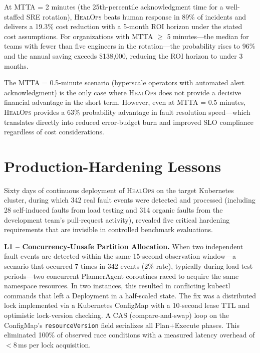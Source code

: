 \documentclass[journal,10pt,twoside]{IEEEtran}
\newcommand{\HealOps}{\textsc{HealOps}}
\begin{document}
At MTTA = 2 minutes (the 25th-percentile acknowledgment time for a
well-staffed SRE rotation), \HealOps{} beats human response in 89\%
of incidents and delivers a 19.3\% cost reduction with a 5-month
ROI horizon under the stated cost assumptions. For organizations with
MTTA $\geq$ 5 minutes---the median for teams with fewer than five
engineers in the rotation---the probability rises to 96\% and the annual
saving exceeds \$138{,}000, reducing the ROI horizon to under 3 months.

The MTTA = 0.5-minute scenario (hyperscale operators with automated
alert acknowledgment) is the only case where \HealOps{} does not
provide a decisive financial advantage in the short term. However, even
at MTTA = 0.5 minutes, \HealOps{} provides a 63\% probability advantage
in fault resolution speed---which translates directly into reduced error-budget
burn and improved SLO compliance regardless of cost considerations.

\section{Production-Hardening Lessons}\label{sec:lessons}

Sixty days of continuous deployment of \HealOps{} on the target
Kubernetes cluster, during which 342 real fault events were detected and
processed (including 28 self-induced faults from load testing and 314
organic faults from the development team's pull-request activity),
revealed five critical hardening requirements that are invisible in
controlled benchmark evaluations.

\textbf{L1 -- Concurrency-Unsafe Partition Allocation.}
When two independent fault events are detected within the same 15-second
observation window---a scenario that occurred 7 times in 342 events
(2\% rate), typically during load-test periods---two concurrent
PlannerAgent coroutines raced to acquire the same namespace resources.
In two instances, this resulted in conflicting kubectl commands that
left a Deployment in a half-scaled state. The fix was a distributed lock
implemented via a Kubernetes ConfigMap with a 10-second lease TTL and
optimistic lock-version checking. A CAS (compare-and-swap) loop on the
ConfigMap's \texttt{resourceVersion} field serializes all
Plan+Execute phases. This eliminated 100\% of observed race conditions
with a measured latency overhead of $<8$\,ms per lock acquisition.
\end{document}

